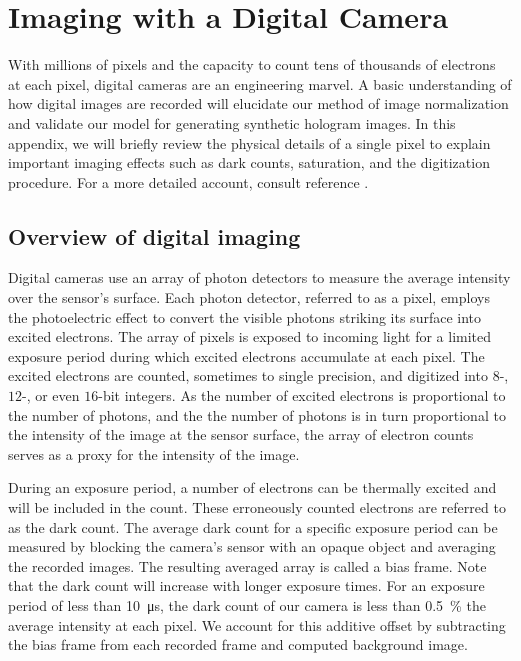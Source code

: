 \SkipTocEntry\chapter{Imaging with a Digital Camera} 
\label{app:digital_imaging}

With millions of pixels and the capacity to count tens of thousands of electrons
at each pixel, digital cameras are an engineering marvel. 
A basic understanding of how digital images are recorded will elucidate
our method of image normalization and validate our model for generating synthetic
hologram images. In this appendix, we will briefly review the physical
details of a single pixel to explain important imaging effects such as
dark counts, saturation, and the digitization procedure. For a more detailed account,
consult reference \cite{nakamura2017}.

\section{Overview of digital imaging}

Digital cameras use an array of photon detectors to measure the
average intensity over the sensor's surface. Each photon detector, referred to as a pixel,
employs the photoelectric effect to convert the visible photons striking its surface into
excited electrons.
The array of pixels is exposed to incoming light for a limited
exposure period during which excited electrons accumulate at each pixel.
The excited electrons are counted, sometimes to single precision,
and digitized into $8$-, $12$-, or even $16$-bit integers. As the number of
excited electrons is proportional to the number of photons, and the the number of
photons is in turn proportional to the intensity of the image at the
sensor surface, the array of electron counts serves as a proxy for
the intensity of the image.

During an exposure period, a number of electrons can be thermally excited and
will be included in the count. These erroneously counted electrons are referred to
as the dark count. The average dark count for a specific exposure period can be measured
by blocking the camera's sensor with an opaque object and averaging the
recorded images. The resulting averaged array is called a bias frame.
Note that the dark count will increase with longer exposure times.
For an exposure period of less than \SI{10}{\us}, the dark
count of our camera is less than \SI{0.5}{\percent} the average intensity
at each pixel. We account for this additive offset by subtracting the bias
frame from each recorded frame and computed background image.

